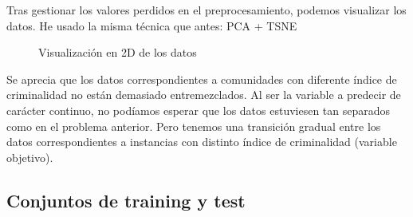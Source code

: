 \documentclass[a4]{article}
\begin{document}
Tras gestionar los valores perdidos en el preprocesamiento, podemos
visualizar los datos. He usado la misma técnica que antes: PCA + TSNE

\vspace{-4mm}
\begin{figure}[H]
  \centering
  \caption{Visualización en 2D de los datos}
  \label{fig:com_2D-projection}
\end{figure}
\vspace{-4mm}

Se aprecia que los datos correspondientes a comunidades con diferente
índice de criminalidad no están demasiado entremezclados. Al ser la
variable a predecir de carácter continuo, no podíamos esperar que los
datos estuviesen tan separados como en el problema anterior. Pero
tenemos una transición gradual entre los datos correspondientes a
instancias con distinto índice de criminalidad (variable objetivo).

\subsection{Conjuntos de training y test}
\end{document}
